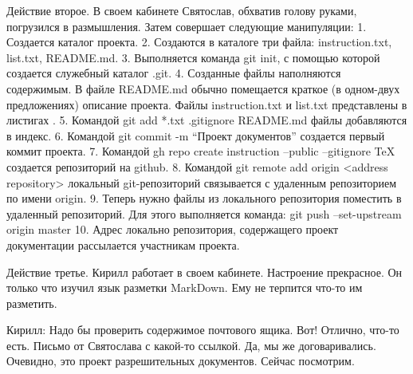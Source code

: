 Действие второе.
В своем кабинете Святослав, обхватив голову руками, погрузился в размышления.
Затем совершает следующие манипуляции:
1. Создается каталог проекта.
2. Создаются в каталоге три файла: instruction.txt, list.txt, README.md.
3. Выполняется команда git init, с помощью которой создается служебный каталог .git.
4. Созданные файлы наполняются содержимым. В файле README.md обычно помещается краткое (в одном-двух
предложениях) описание проекта. Файлы instruction.txt и list.txt представлены в листигах .
5. Командой git add *.txt .gitignore README.md файлы добавляются в индекс.
6. Командой git commit -m ``Проект документов'' создается первый коммит проекта.
7. Командой
 gh repo create instruction --public --gitignore TeX
	создается репозиторий на github.
8. Командой 
	git remote add origin <address repository>
локальный git-репозиторий связывается с удаленным репозиторием по имени origin.
9. Теперь нужно файлы из локального репозитория поместить в удаленный репозиторий. Для этого
выполняется команда:
	git push --set-upstream origin master
10. Адрес локально репозитория, содержащего проект документации рассылается участникам
проекта. 

Действие третье.
Кирилл работает в своем кабинете. Настроение прекрасное. Он только что изучил язык разметки
MarkDown. Ему не терпится что-то им разметить. 

Кирилл: Надо бы проверить содержимое почтового ящика. Вот! Отлично, что-то есть. 
Письмо от Святослава с какой-то ссылкой. Да, мы же договаривались. Очевидно, это проект
разрешительных документов. Сейчас посмотрим.
